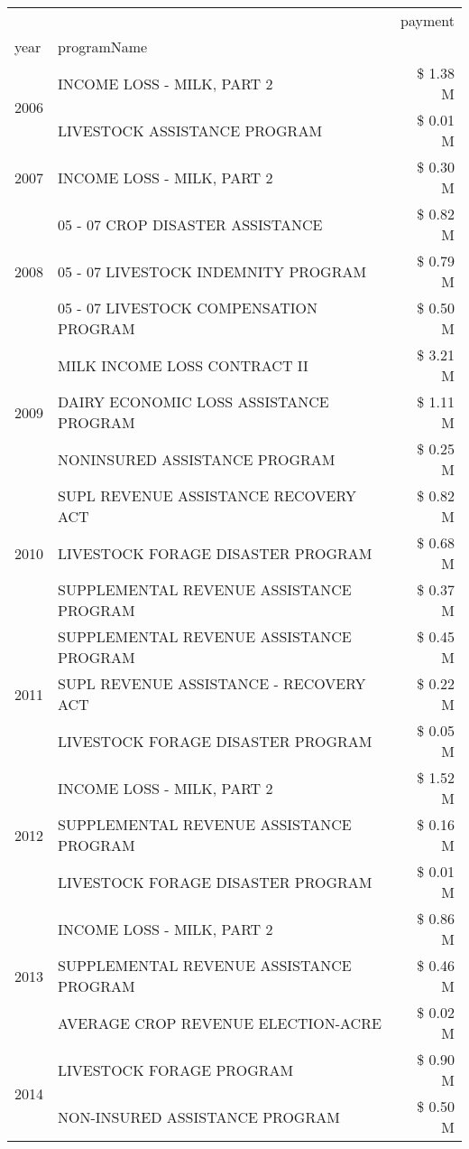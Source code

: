 \begin{tabular}{llr}
\toprule
 &  & payment \\
year & programName &  \\
\midrule
\multirow[t]{2}{*}{2006} & INCOME LOSS - MILK, PART 2 & \$ 1.38 M \\
 & LIVESTOCK ASSISTANCE PROGRAM & \$ 0.01 M \\
\cline{1-3}
2007 & INCOME LOSS - MILK, PART 2 & \$ 0.30 M \\
\cline{1-3}
\multirow[t]{3}{*}{2008} & 05 - 07 CROP DISASTER ASSISTANCE & \$ 0.82 M \\
 & 05 - 07 LIVESTOCK INDEMNITY PROGRAM & \$ 0.79 M \\
 & 05 - 07 LIVESTOCK COMPENSATION PROGRAM & \$ 0.50 M \\
\cline{1-3}
\multirow[t]{3}{*}{2009} & MILK INCOME LOSS CONTRACT II & \$ 3.21 M \\
 & DAIRY ECONOMIC LOSS ASSISTANCE PROGRAM & \$ 1.11 M \\
 & NONINSURED ASSISTANCE PROGRAM & \$ 0.25 M \\
\cline{1-3}
\multirow[t]{3}{*}{2010} & SUPL REVENUE ASSISTANCE RECOVERY ACT & \$ 0.82 M \\
 & LIVESTOCK FORAGE DISASTER  PROGRAM & \$ 0.68 M \\
 & SUPPLEMENTAL REVENUE ASSISTANCE PROGRAM & \$ 0.37 M \\
\cline{1-3}
\multirow[t]{3}{*}{2011} & SUPPLEMENTAL REVENUE ASSISTANCE PROGRAM & \$ 0.45 M \\
 & SUPL REVENUE ASSISTANCE - RECOVERY ACT & \$ 0.22 M \\
 & LIVESTOCK FORAGE DISASTER PROGRAM & \$ 0.05 M \\
\cline{1-3}
\multirow[t]{3}{*}{2012} & INCOME LOSS - MILK, PART 2 & \$ 1.52 M \\
 & SUPPLEMENTAL REVENUE ASSISTANCE PROGRAM & \$ 0.16 M \\
 & LIVESTOCK FORAGE DISASTER PROGRAM & \$ 0.01 M \\
\cline{1-3}
\multirow[t]{3}{*}{2013} & INCOME LOSS - MILK, PART 2 & \$ 0.86 M \\
 & SUPPLEMENTAL REVENUE ASSISTANCE PROGRAM & \$ 0.46 M \\
 & AVERAGE CROP REVENUE ELECTION-ACRE & \$ 0.02 M \\
\cline{1-3}
\multirow[t]{3}{*}{2014} & LIVESTOCK FORAGE PROGRAM & \$ 0.90 M \\
 & NON-INSURED ASSISTANCE PROGRAM & \$ 0.50 M \\

\end{tabular}
